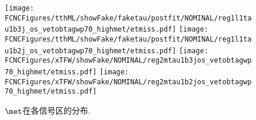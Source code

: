 \begin{figure}[H]
\centering
\texttt{[image: \\FCNCFigures/tthML/showFake/faketau/postfit/NOMINAL/reg1l1tau1b3j\_os\_vetobtagwp70\_highmet/etmiss.pdf]}
\texttt{[image: \\FCNCFigures/tthML/showFake/faketau/postfit/NOMINAL/reg1l1tau1b2j\_os\_vetobtagwp70\_highmet/etmiss.pdf]}
\texttt{[image: \\FCNCFigures/xTFW/showFake/NOMINAL/reg2mtau1b3jos\_vetobtagwp70\_highmet/etmiss.pdf]}
\texttt{[image: \\FCNCFigures/xTFW/showFake/NOMINAL/reg2mtau1b2jos\_vetobtagwp70\_highmet/etmiss.pdf]}
\caption{$\met$在各信号区的分布. }
\label{fig:met}
\end{figure}
